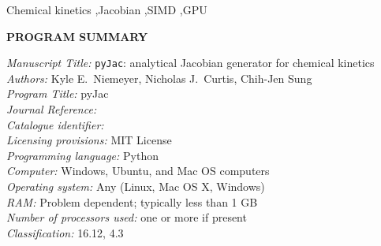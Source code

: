 \documentclass[preprint,12pt]{elsarticle}
\newcounter{bla}
\begin{document}
\begin{frontmatter}
\begin{keyword}
Chemical kinetics \sep Jacobian \sep SIMD \sep GPU
\end{keyword}

\end{frontmatter}





{\bf PROGRAM SUMMARY}

\begin{small}
\noindent
{\em Manuscript Title:} \texttt{pyJac}: analytical Jacobian generator for chemical kinetics \\
{\em Authors:} Kyle E.\ Niemeyer, Nicholas J.\ Curtis, Chih-Jen Sung \\
{\em Program Title:} pyJac \\
{\em Journal Reference:}                                      \\
{\em Catalogue identifier:}                                   \\
{\em Licensing provisions:} MIT License \\
{\em Programming language:} Python \\
{\em Computer:} Windows, Ubuntu, and Mac OS computers \\
{\em Operating system:} Any (Linux, Mac OS X, Windows) \\
{\em RAM:} Problem dependent; typically less than 1 GB \\
{\em Number of processors used:} one or more if present  \\
{\em Classification:} 16.12, 4.3                                \\

\end{small}
\end{document}
